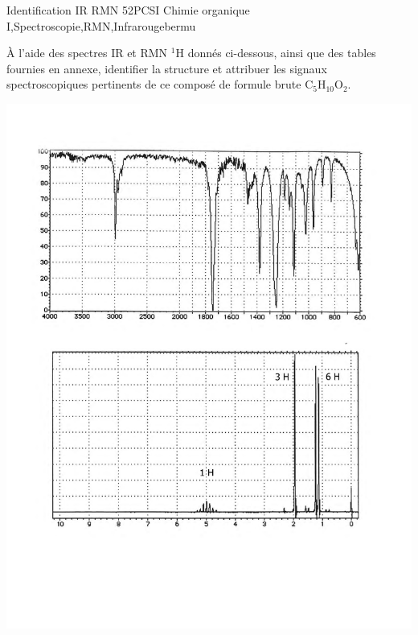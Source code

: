 \begin{exercise}{Identification IR RMN 5}{2}{PCSI}
{Chimie organique I,Spectroscopie,RMN,Infrarouge}{bermu}

À l'aide des spectres IR et RMN $^{1}$H donnés ci-dessous, ainsi que des tables fournies en annexe, identifier la structure et attribuer les signaux spectroscopiques pertinents de ce composé de formule brute $\mathrm{C_5H_{10}O_2}$.
 
\vspace{2em}
 
\includegraphics[width=\linewidth]{chimiePC/orga/IR_RMN_5.pdf}

\end{exercise}
\begin{solution}
\begin{center}
\end{center}
\end{solution}

